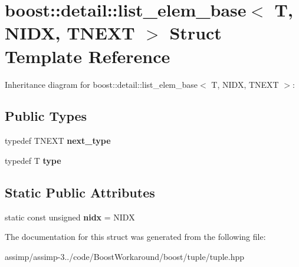 \hypertarget{structboost_1_1detail_1_1list__elem__base}{\section{boost\+:\+:detail\+:\+:list\+\_\+elem\+\_\+base$<$ T, N\+I\+D\+X, T\+N\+E\+X\+T $>$ Struct Template Reference}
\label{structboost_1_1detail_1_1list__elem__base}
}


Inheritance diagram for boost\+:\+:detail\+:\+:list\+\_\+elem\+\_\+base$<$ T, N\+I\+D\+X, T\+N\+E\+X\+T $>$\+:
\subsection*{Public Types}
\begin{DoxyCompactItemize}
\item 
\hypertarget{structboost_1_1detail_1_1list__elem__base_a6b2c580e3cc1f44669c849c78909e6e8}{typedef T\+N\+E\+X\+T {\bfseries next\+\_\+type}}\label{structboost_1_1detail_1_1list__elem__base_a6b2c580e3cc1f44669c849c78909e6e8}

\item 
\hypertarget{structboost_1_1detail_1_1list__elem__base_af2d90eb5fea68c4c8bc4514cb36d27af}{typedef T {\bfseries type}}\label{structboost_1_1detail_1_1list__elem__base_af2d90eb5fea68c4c8bc4514cb36d27af}

\end{DoxyCompactItemize}
\subsection*{Static Public Attributes}
\begin{DoxyCompactItemize}
\item 
\hypertarget{structboost_1_1detail_1_1list__elem__base_ade5d44d23cc8a40d9e4c5148cfaaa155}{static const unsigned {\bfseries nidx} = N\+I\+D\+X}\label{structboost_1_1detail_1_1list__elem__base_ade5d44d23cc8a40d9e4c5148cfaaa155}

\end{DoxyCompactItemize}


The documentation for this struct was generated from the following file\+:\begin{DoxyCompactItemize}
\item 
assimp/assimp-\/3../code/\+Boost\+Workaround/boost/tuple/tuple.\+hpp\end{DoxyCompactItemize}
